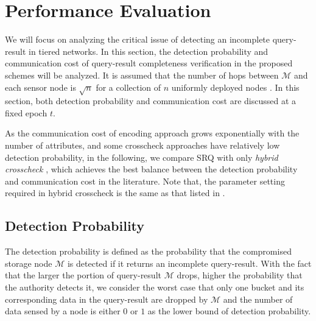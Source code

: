 \documentclass[conference]{IEEEtran}
\begin{document}
\section{Performance Evaluation}\label{sec: Performance Evaluation}
We will focus on analyzing the critical issue of detecting an incomplete query-result in tiered networks. In this section, the detection probability and communication cost of query-result completeness verification in the proposed schemes will be analyzed. It is assumed that the number of hops between $\mathcal{M}$ and each sensor node is $\sqrt{n}$ for a collection of $n$ uniformly deployed nodes \cite{cp05}. In this section, both detection probability and communication cost are discussed at a fixed epoch $t$.

As the communication cost of encoding approach \cite{sl08} grows exponentially with the number of attributes, and some crosscheck approaches \cite{szz09,zsz09} have relatively low detection probability, in the following, we compare SRQ with only \emph{hybrid crosscheck} \cite{zsz09}, which achieves the best balance between the detection probability and communication cost in the literature. Note that, the parameter setting required in hybrid crosscheck is the same as that listed in \cite{zsz09}.

\subsection{Detection Probability}\label{sec: Detection Probability}
The detection probability is defined as the probability that the compromised storage node $\mathcal{M}$ is detected if it returns an incomplete query-result. With the fact that the larger the portion of query-result $\mathcal{M}$ drops, higher the probability that the authority detects it, we consider the worst case that only one bucket and its corresponding data in the query-result are dropped by $\mathcal{M}$ and the number of data sensed by a node is either $0$ or $1$ as the lower bound of detection probability.
\end{document}
